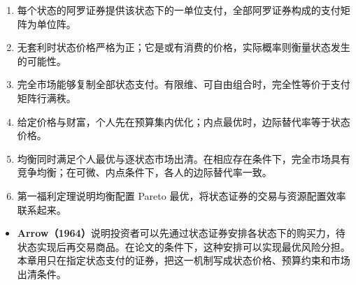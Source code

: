 \WJChapterSummary
\begin{tcolorbox}[summary]
\begin{enumerate}
 \item 每个状态的阿罗证券提供该状态下的一单位支付，全部阿罗证券构成的支付矩阵为单位阵。
 \item 无套利时状态价格严格为正；它是或有消费的价格，实际概率则衡量状态发生的可能性。
 \item 完全市场能够复制全部状态支付。有限维、可自由组合时，完全性等价于支付矩阵行满秩。
 \item 给定价格与财富，个人先在预算集内优化；内点最优时，边际替代率等于状态价格。
 \item 均衡同时满足个人最优与逐状态市场出清。在相应存在条件下，完全市场具有竞争均衡；在可微、内点条件下，各人的边际替代率一致。
 \item 第一福利定理说明均衡配置 Pareto 最优，将状态证券的交易与资源配置效率联系起来。
\end{enumerate}
\end{tcolorbox}

\begin{tcolorbox}[knowledge,breakable=false,title={参考文献与本章贡献}]
\begin{itemize}
 \item \textbf{Arrow（1964）}说明投资者可以先通过状态证券安排各状态下的购买力，待状态实现后再交易商品。在论文的条件下，这种安排可以实现最优风险分担。本章用只在指定状态支付的证券，把这一机制写成状态价格、预算约束和市场出清条件。
\end{itemize}
\end{tcolorbox}

\fi

\WJChapterExercises

\endgroup
